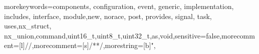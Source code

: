 \newcommand{\comment}[1]{}

\newcommand{\longer}[2]{#1}

\newcommand{\ds}{\displaystyle}

\def\gs{1.0}

\newenvironment{denselist}[1][可改变的列表题目]{%
\begin{list}{\textbf{\hei #1} \arabic{newlist}：} %
    {
    \usecounter{newlist}
     \setlength{\labelwidth}{22pt} %
     \setlength{\labelsep}{0cm} %
     \setlength{\leftmargin}{0cm} %
     \setlength{\rightmargin}{0cm}
     \setlength{\parsep}{0ex} %
     \setlength{\itemsep}{0ex} %
     \setlength{\itemindent}{44pt} %
     \setlength{\listparindent}{22pt} %
    }}
{\end{list}}%

\newcommand{\chref}[1]{\CJKnumber{\ref{#1}}}
\newcommand{\KH}[1]{\!\!（#1）\!\!}
\newcommand\dlmu@underline[2][5cm]{\hskip1pt\underline{\hb@xt@ #1{\hss#2\hss}}\hskip3pt}
\let\coverunderline\dlmu@underline

\setlength{\parindent}{2em}
\renewcommand{\lstlistingname}{\wuhao 源码}

\setlength{\headheight}{24pt}


  {morekeywords={components, configuration, event, generic, implementation, includes, interface, module,new, norace, post, provides, signal, task, uses,nx\_struct, nx\_union,command,uint16\_t,uint8\_t,uint32\_t,as,void},sensitive=false,morecomment=[l]{//},morecomment=[s]{/*}{*/},morestring=[b]",}


\renewcommand\arraystretch{1.25}
